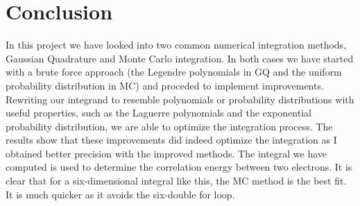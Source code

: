 \documentclass[norsk,a4paper,11pt]{article}
\begin{document}
\section{Conclusion}
    In this project we have looked into two common numerical integration methods, Gaussian Quadrature and
    Monte Carlo integration. In both cases we have started with a brute force approach (the Legendre polynomials
    in GQ and the uniform probability distribution in MC) and proceded to implement
    improvements. Rewriting our integrand to resemble polynomials or probability distributions with
    useful properties, such as the Laguerre polynomials 
    and the exponential probability distribution, we are able to optimize the integration process.
    The results show that these improvements did indeed optimize the integration as I obtained better precision with the
    improved methods. The integral we have computed is used to determine the correlation energy between two electrons. It
    is clear that for a six-dimensional integral like this, the MC method is the best fit. It is much quicker as it avoids
    the six-double for loop.
    
\end{document}
